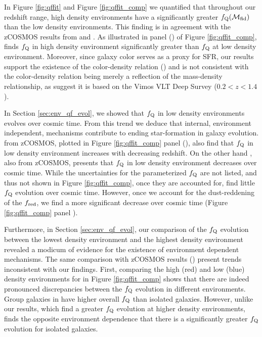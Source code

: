 \documentclass{emulateapj}
\begin{document}
In Figure \ref{fig:qffit} and Figure \ref{fig:qffit_comp} we
quantified that throughout our redshift range, high density
environments have a significantly greater
$f_{\rm{Q}}(\mathcal{M}_{\rm{fid}})$ than the low density
environments. This finding is in agreement with the zCOSMOS results
from \cite{Cucciati:2010aa} and \cite{Kovac:2014aa}. As illustrated in
panel (\kovacpanel) of Figure \ref{fig:qffit_comp}, \cite{Kovac:2014aa} finds $f_{\rm{Q}}$ in high density environment
significantly greater than $f_{\rm{Q}}$ at low density
environment. Moreover, since galaxy color serves as a proxy for SFR,
our results support the existence of the color-density relation
(\citealt{Cucciati:2010aa, Cooper:2010aa}) and is not consistent with
the color-density relation being merely a reflection of the
mass-density relationship, as \cite{Scodeggio:2009aa} suggest it is
based on the Vimos VLT Deep Survey ($0.2 < z< 1.4$).


In Section \ref{sec:env_qf_evol}, we showed that $f_{\rm{Q}}$ in
low density environments evolves over cosmic time. From this trend we
deduce that internal, environment independent, mechanisms contribute
to ending star-formation in galaxy evolution. \cite{Iovino:2010aa}
from zCOSMOS, plotted in Figure \ref{fig:qffit_comp}  panel (\iovinopanel), also find that
$f_{\rm{Q}}$ in low density environment increases with decreasing redshift. On the other hand \cite{Kovac:2014aa}, also from zCOSMOS, presents that $f_{\rm{Q}}$ in low density environment decreases over cosmic time. While the uncertainties for the parameterized $f_{\rm{Q}}$ are not listed, and thus not shown in Figure \ref{fig:qffit_comp}, once they are accounted for, \cite{Kovac:2014aa} find little $f_{\rm{Q}}$ evolution over cosmic time. However, once we account for the dust-reddening of the $f_{\rm{red}}$, we find a more significant decrease over cosmic time (Figure \ref{fig:qffit_comp} panel \kovacpanel).

Furthermore, in Section \ref{sec:env_qf_evol}, our comparison of the
$f_{\rm{Q}}$ evolution between the lowest density environment and the
highest density environment revealed a modicum of evidence for the
existence of environment dependent mechanisms. The same comparison
with zCOSMOS results (\citealt{Iovino:2010aa, Kovac:2014aa}) present
trends inconsistent with our findings. First, comparing the high (red)
and low (blue) density environments for \cite{Iovino:2010aa} in Figure
\ref{fig:qffit_comp} shows that there are indeed pronounced
discrepancies between the $f_{\rm{Q}}$ evolution in different
environments. Group galaxies in \cite{Iovino:2010aa} have higher
overall $f_{\rm{Q}}$ than isolated galaxies. However, unlike our
results, which find a greater $f_{\rm{Q}}$ evolution at higher density
environments, \cite{Iovino:2010aa} finds the opposite environment
dependence that there is a significantly greater $f_{\rm{Q}}$
evolution for isolated galaxies.
\end{document}
